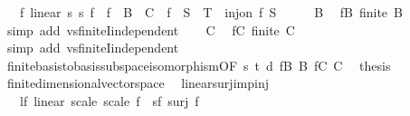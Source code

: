 \begin{isabellebody}
\ \ \ {\isachardoublequoteopen}{\isasymexists}f{\isachardot}{\kern0pt}\ linear\ s{}\ s{}\ f\ {\isasymand}\ f\ {\isacharbackquote}{\kern0pt}\ B\ {\isacharequal}{\kern0pt}\ C\ {\isasymand}\ f\ {\isacharbackquote}{\kern0pt}\ S\ {\isacharequal}{\kern0pt}\ T\ {\isasymand}\ inj{\isacharunderscore}{\kern0pt}on\ f\ S{\isachardoublequoteclose}\isanewline
%
\isadelimproof
%
\endisadelimproof
%
\isatagproof
{}\isamarkupfalse%
\ {\isacharminus}{\kern0pt}\isanewline
\ \ \isamarkupfalse%
\ B\ \isamarkupfalse%
\ fB{\isacharcolon}{\kern0pt}\ {\isachardoublequoteopen}finite\ B{\isachardoublequoteclose}\isanewline
\ \ \ \ \isamarkupfalse%
\ {\isacharparenleft}{\kern0pt}simp\ add{\isacharcolon}{\kern0pt}\ vs{}{\isachardot}{\kern0pt}finiteI{\isacharunderscore}{\kern0pt}independent{\isacharparenright}{\kern0pt}\isanewline
\ \ \isamarkupfalse%
\ C\ \isamarkupfalse%
\ fC{\isacharcolon}{\kern0pt}\ {\isachardoublequoteopen}finite\ C{\isachardoublequoteclose}\isanewline
\ \ \ \ \isamarkupfalse%
\ {\isacharparenleft}{\kern0pt}simp\ add{\isacharcolon}{\kern0pt}\ vs{}{\isachardot}{\kern0pt}finiteI{\isacharunderscore}{\kern0pt}independent{\isacharparenright}{\kern0pt}\isanewline
\ \ \isamarkupfalse%
\ finite{\isacharunderscore}{\kern0pt}basis{\isacharunderscore}{\kern0pt}to{\isacharunderscore}{\kern0pt}basis{\isacharunderscore}{\kern0pt}subspace{\isacharunderscore}{\kern0pt}isomorphism{\isacharbrackleft}{\kern0pt}OF\ s\ t\ d\ fB\ B\ fC\ C{\isacharbrackright}{\kern0pt}\ \isamarkupfalse%
\ {\isacharquery}{\kern0pt}thesis\ \isacommand{{\isachardot}{\kern0pt}}\isamarkupfalse%
\isanewline
{}\isamarkupfalse%
%
\endisatagproof
{\isafoldproof}%
%
\isadelimproof
\isanewline
%
\endisadelimproof
\isanewline
{}\isamarkupfalse%
\isanewline
\isanewline
{}\isamarkupfalse%
\ finite{\isacharunderscore}{\kern0pt}dimensional{\isacharunderscore}{\kern0pt}vector{\isacharunderscore}{\kern0pt}space\ \isanewline
\isanewline
{}\isamarkupfalse%
\ linear{\isacharunderscore}{\kern0pt}surj{\isacharunderscore}{\kern0pt}imp{\isacharunderscore}{\kern0pt}inj{\isacharcolon}{\kern0pt}\isanewline
\ \ \ lf{\isacharcolon}{\kern0pt}\ {\isachardoublequoteopen}linear\ scale\ scale\ f{\isachardoublequoteclose}\ \ sf{\isacharcolon}{\kern0pt}\ {\isachardoublequoteopen}surj\ f{\isachardoublequoteclose}\isanewline

\end{isabellebody}
